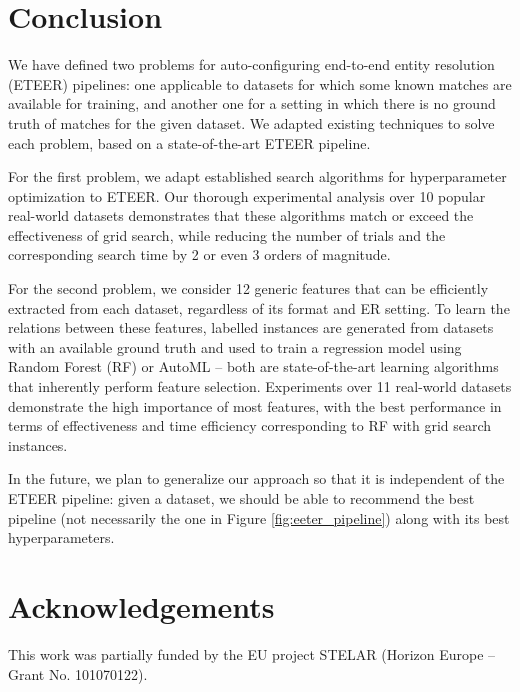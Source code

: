 \section{Conclusion}\label{sec:conclusion}

We have defined two problems for auto-configuring end-to-end entity resolution (ETEER) pipelines: one applicable to datasets for which some known matches are available for training, and another one for a setting in which there is no ground truth of matches for the given dataset. We adapted existing techniques to solve each problem, based on a state-of-the-art ETEER pipeline.

For the first problem, we adapt established search algorithms for hyperparameter optimization to ETEER. Our thorough experimental analysis over 10 popular real-world datasets demonstrates that these algorithms match or exceed the effectiveness of grid search, while reducing the number of trials and the corresponding search time by 2 or even 3 orders of magnitude. 

For the second problem, we consider 12 generic features that can be efficiently extracted from each dataset, regardless of its format and ER setting. To learn the relations between these features, labelled instances are generated from datasets with an available ground truth and used to train a regression model using Random Forest (RF) or AutoML -- both are state-of-the-art learning algorithms that inherently perform feature selection. 
Experiments over 11 real-world datasets demonstrate the high importance of most features, with the best performance in terms of effectiveness and time efficiency corresponding to RF with grid search instances. 

In the future, we plan to generalize our approach so that it is independent of the ETEER pipeline: given a dataset, we should be able to recommend the best pipeline (not necessarily the one in Figure \ref{fig:eeter_pipeline}) along with its best hyperparameters.

\section*{Acknowledgements}
This work was partially funded by the EU project STELAR (Horizon Europe -- Grant No. 101070122).





















